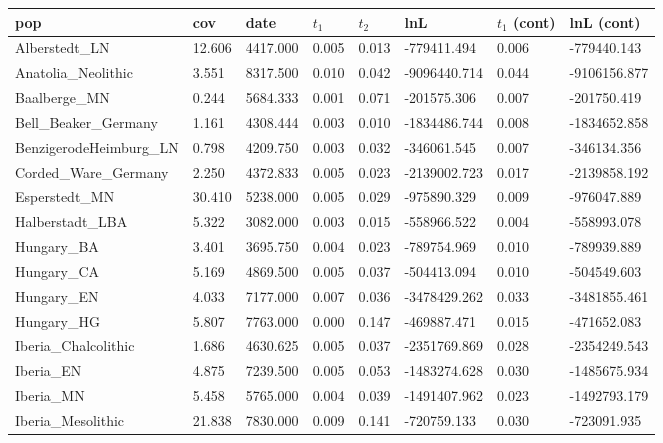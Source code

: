 \documentclass[11pt, oneside]{article}   	%
\begin{document}
\begin{table}[h]
\centering
\begin{tabular}{llllllll}
pop                     & cov    & date     & $t_1$ & $t_2$ & lnL          & $t_1$ (cont) & lnL (cont)  \\ \hline
Alberstedt\_LN          & 12.606 & 4417.000 & 0.005 & 0.013 & -779411.494  & 0.006       & -779440.143  \\
Anatolia\_Neolithic     & 3.551  & 8317.500 & 0.010 & 0.042 & -9096440.714 & 0.044       & -9106156.877 \\
Baalberge\_MN           & 0.244  & 5684.333 & 0.001 & 0.071 & -201575.306  & 0.007       & -201750.419  \\
Bell\_Beaker\_Germany   & 1.161  & 4308.444 & 0.003 & 0.010 & -1834486.744 & 0.008       & -1834652.858 \\
BenzigerodeHeimburg\_LN & 0.798  & 4209.750 & 0.003 & 0.032 & -346061.545  & 0.007       & -346134.356  \\
Corded\_Ware\_Germany   & 2.250  & 4372.833 & 0.005 & 0.023 & -2139002.723 & 0.017       & -2139858.192 \\
Esperstedt\_MN          & 30.410 & 5238.000 & 0.005 & 0.029 & -975890.329  & 0.009       & -976047.889  \\
Halberstadt\_LBA        & 5.322  & 3082.000 & 0.003 & 0.015 & -558966.522  & 0.004       & -558993.078  \\
Hungary\_BA             & 3.401  & 3695.750 & 0.004 & 0.023 & -789754.969  & 0.010       & -789939.889  \\
Hungary\_CA             & 5.169  & 4869.500 & 0.005 & 0.037 & -504413.094  & 0.010       & -504549.603  \\
Hungary\_EN             & 4.033  & 7177.000 & 0.007 & 0.036 & -3478429.262 & 0.033       & -3481855.461 \\
Hungary\_HG             & 5.807  & 7763.000 & 0.000 & 0.147 & -469887.471  & 0.015       & -471652.083  \\
Iberia\_Chalcolithic    & 1.686  & 4630.625 & 0.005 & 0.037 & -2351769.869 & 0.028       & -2354249.543 \\
Iberia\_EN              & 4.875  & 7239.500 & 0.005 & 0.053 & -1483274.628 & 0.030       & -1485675.934 \\
Iberia\_MN              & 5.458  & 5765.000 & 0.004 & 0.039 & -1491407.962 & 0.023       & -1492793.179 \\
Iberia\_Mesolithic      & 21.838 & 7830.000 & 0.009 & 0.141 & -720759.133  & 0.030       & -723091.935  \\

\end{tabular}
\end{table}
\end{document}
